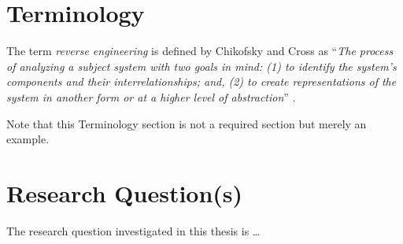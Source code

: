 \section{Terminology}

The term \emph{reverse engineering} is defined by Chikofsky and Cross as 
``\emph{The process of analyzing a subject system with two goals in mind: 
(1) to identify the system's components and their interrelationships; and,
(2) to create representations of the system in another form or at a higher 
level of abstraction}'' .

Note that this Terminology section is not a required section but 
merely an example.

\section{Research Question(s)}

The research question investigated in this thesis is \ldots


